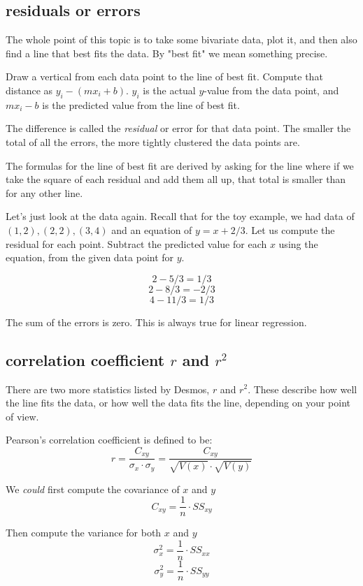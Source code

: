 \documentclass[11pt, oneside]{article}
\begin{document}
\subsection*{residuals or errors}
The whole point of this topic is to take some bivariate data, plot it, and then also find a line that best fits the data.  By "best fit" we mean something precise.  

Draw a vertical from each data point to the line of best fit.  Compute that distance as $y_i - (mx_i + b)$.  $y_i$ is the actual $y$-value from the data point, and $mx_i - b$ is the predicted value from the line of best fit.

The difference is called the \emph{residual} or error for that data point.  The smaller the total of all the errors, the more tightly clustered the data points are.

The formulas for the line of best fit are derived by asking for the line where if we take the square of each residual and add them all up, that total is smaller than for any other line.

Let's just look at the data again.  Recall that for the toy example, we had data of $(1,2),(2,2),(3,4)$ and an equation of $y = x + 2/3$.  Let us compute the residual for each point.  Subtract the predicted value for each $x$ using the equation, from the given data point for $y$.

\[ 2 - 5/3 = 1/3 \]
\[ 2 - 8/3 = -2/3 \]
\[ 4 - 11/3 = 1/3 \]

The sum of the errors is zero.  This is always true for linear regression.

\subsection*{correlation coefficient $r$ and $r^2$}

There are two more statistics listed by Desmos, $r$ and $r^2$.  These describe how well the line fits the data, or how well the data fits the line, depending on your point of view.

Pearson's correlation coefficient is defined to be:
\[ r = \frac{C_{xy}}{\sigma_x \cdot \sigma_y} = \frac{C_{xy}}{\sqrt{V(x)} \cdot \sqrt{V(y)}} \]

We \emph{could} first compute the covariance of $x$ and $y$
\[ C_{xy} = \frac{1}{n} \cdot SS_{xy} \]

Then compute the variance for both $x$ and $y$
\[ \sigma^2_x = \frac{1}{n} \cdot SS_{xx} \]
\[ \sigma^2_y = \frac{1}{n} \cdot SS_{yy} \]
\end{document}
